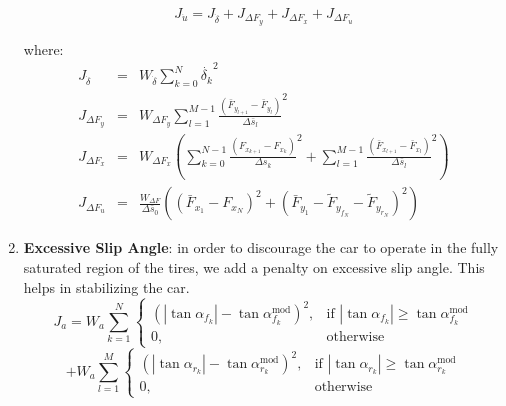\documentclass[a4paper, onecolumn, 11pt]{article}
\begin{document}
\begin{enumerate}
    \begin{equation}
        J_{\dot{u}} = J_{\dot{\delta}} + J_{\Delta F_y} + J_{\Delta F_x} + J_{\Delta F_u}
    \end{equation}

    where:
    \begin{eqnarray}
        J_{\dot{\delta}} &=& W_{\dot{\delta}}\sum_{k=0}^{N} \dot{\delta_k}^2 \\
        J_{\Delta F_y} &=& W_{\Delta F_y} \sum_{l=1}^{M-1} \frac{\left(\bar{F}_{y_{l+1}}-\bar{F}_{y_{l}}\right)}{\Delta \bar{s}_l}^2 \\
        J_{\Delta F_x} &=& W_{\Delta F_x} \left(\sum_{k=0}^{N-1} \frac{\left({F}_{x_{k+1}}-{F}_{x_{k}}\right)}{\Delta {s}_k}^2  + 
                                                \sum_{l=1}^{M-1} \frac{\left(\bar{F}_{x_{l+1}}-\bar{F}_{x_{l}}\right)}{\Delta \bar{s}_l}^2  \right) \\
        J_{\Delta F_u} &=& \frac{W_{\Delta F}}{\Delta \bar{s}_0}\left( \left(\bar{F}_{x_1}-F_{x_N}\right)^2 + \left(\bar{F}_{y_1}-\tilde{F}_{y_{f_N}}-\tilde{F}_{y_{r_N}}\right)^2 \right) 
    \end{eqnarray}

    \item \textbf{Excessive Slip Angle}: in order to discourage the car to operate in the fully saturated region of the tires, we add a penalty on excessive slip angle. This helps in stabilizing the car.
    \begin{equation}
        J_{a} = W_{a}\sum_{k=1}^{N}
        \begin{cases}
        \left(|\tan \alpha_{f_k}|-\tan \alpha_{f_k}^{\text{mod}}\right)^2, & \text{if } |\tan \alpha_{f_k}| \geq  \tan \alpha_{f_k}^{\text{mod}}\\
        0, & \text{otherwise}
        \end{cases}
        \end{equation}
        \[  + W_{a}\sum_{l=1}^{M} 
        \begin{cases}
        \left(|\tan \alpha_{r_k}|-\tan \alpha_{r_k}^{\text{mod}}\right)^2, & \text{if } |\tan \alpha_{r_k}| \geq  \tan \alpha_{r_k}^{\text{mod}}\\
        0, & \text{otherwise}
        \end{cases}
        \]
\end{enumerate}
\end{document}
